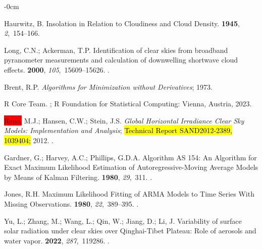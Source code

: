 \documentclass[applsci,article,accept,moreauthors,pdftex]{Definitions/mdpi}
\begin{document}
\begin{adjustwidth}{-\extralength}{0cm}
\begin{thebibliography}{999}
Haurwitz, B.
\newblock Insolation in {Relation} to {Cloudiness} and {Cloud} {Density}.
 {\bf 1945}, {\em 2},~154--166.

Long, C.N.; Ackerman, T.P.
\newblock Identification of clear skies from broadband pyranometer measurements
  and calculation of downwelling shortwave cloud effects.
 {\bf 2000}, {\em
  105},~15609--15626.
.

Brent, R.P.
\newblock \emph{Algorithms for Minimization without Derivatives};
 {1973}.

{R Core Team}.
;
\newblock R Foundation for Statistical Computing: Vienna, Austria,  2023.



\colorbox{red}{Reno,} 
 M.J.; Hansen, C.W.; Stein, J.S.
\newblock \emph{Global Horizontal Irradiance Clear Sky Models: Implementation and
  Analysis};
\newblock \hl{Technical Report SAND2012-2389, 1039404;} %
  2012.
. %



Gardner, G.; Harvey, A.C.; Phillips, G.D.A.
\newblock Algorithm {AS} 154: An Algorithm for Exact Maximum Likelihood
  Estimation of Autoregressive-Moving Average Models by Means of Kalman
  Filtering.
 {\bf 1980}, {\em 29},~311.
.

Jones, R.H.
\newblock Maximum Likelihood Fitting of {ARMA} Models to Time Series With
  Missing Observations.
 {\bf 1980}, {\em 22},~389--395.
.

Yu, L.; Zhang, M.; Wang, L.; Qin, W.; Jiang, D.; Li, J.
\newblock Variability of surface solar radiation under clear skies over
  Qinghai-Tibet Plateau: Role of aerosols and water vapor.
 {\bf 2022}, {\em 287},~119286.
.


\end{thebibliography}
\end{adjustwidth}
\end{document}
